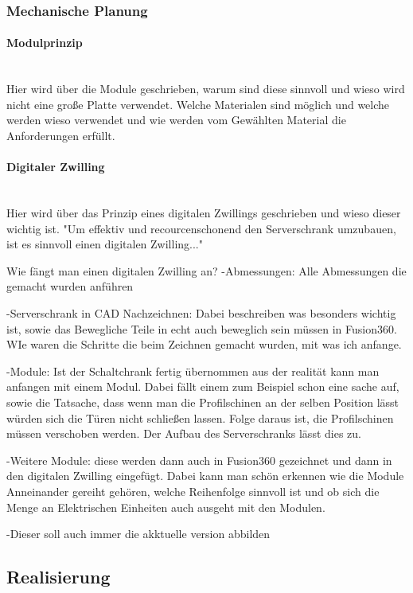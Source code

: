 \subsubsection{Mechanische Planung}

    \paragraph{Modulprinzip}\mbox{}\\
    Hier wird über die Module geschrieben, warum sind diese sinnvoll und wieso wird nicht eine große Platte verwendet. Welche Materialen sind möglich und welche werden wieso verwendet und wie werden vom Gewählten Material die Anforderungen erfüllt.
    
    \paragraph{Digitaler Zwilling}\mbox{}\\
    Hier wird über das Prinzip eines digitalen Zwillings geschrieben und wieso dieser wichtig ist. "Um effektiv und recourcenschonend den Serverschrank umzubauen, ist es sinnvoll einen digitalen Zwilling..." 
    
    Wie fängt man einen digitalen Zwilling an?
    -Abmessungen: Alle Abmessungen die gemacht wurden anführen

    -Serverschrank in CAD Nachzeichnen: Dabei beschreiben was besonders wichtig ist, sowie das Bewegliche Teile in echt auch beweglich sein müssen in Fusion360. WIe waren die Schritte die beim Zeichnen gemacht wurden, mit was ich anfange.

    -Module: Ist der Schaltchrank fertig übernommen aus der realität kann man anfangen mit einem Modul. Dabei fällt einem zum Beispiel schon eine sache auf, sowie die Tatsache, dass wenn man die Profilschinen an der selben Position lässt würden sich die Türen nicht schließen lassen. Folge daraus ist, die Profilschinen müssen verschoben werden. Der Aufbau des Serverschranks lässt dies zu.

    -Weitere Module: diese werden dann auch in Fusion360 gezeichnet und dann in den digitalen Zwilling eingefügt. Dabei kann man schön erkennen wie die Module Anneinander gereiht gehören, welche Reihenfolge sinnvoll ist und ob sich die Menge an Elektrischen Einheiten auch ausgeht mit den Modulen. 

    -Dieser soll auch immer die akktuelle version abbilden


\subsection{Realisierung}
\label{sec:Schaltplan}




